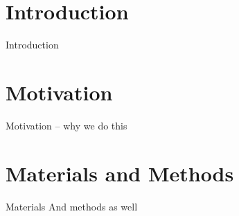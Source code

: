 

\maketitle           %
\frame{\titlepage}   %





\section*{Introduction}
\begin{frame}{Introduction}
  
\end{frame}


\section{Motivation}
\begin{frame}{Motivation – why we do this}

\end{frame}


\section{Materials and Methods}
\begin{frame}{Materials}
             {And methods as well}

\end{frame}
